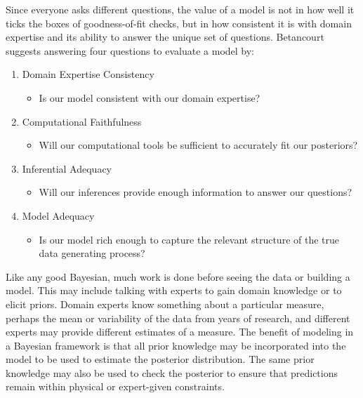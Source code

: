 \documentclass[11pt, oneside, openany]{scrbook}
\providecommand{\tightlist}{%
  \setlength{\itemsep}{0pt}\setlength{\parskip}{0pt}}
\begin{document}
Since everyone asks different questions, the value of a model is not in how well it ticks the boxes of goodness-of-fit checks, but in how consistent it is with domain expertise and its ability to answer the unique set of questions. Betancourt suggests answering four questions to evaluate a model by:

\begin{enumerate}
\def\labelenumi{\arabic{enumi}.}
\tightlist
\item
  Domain Expertise Consistency

  \begin{itemize}
  \tightlist
  \item
    Is our model consistent with our domain expertise?
  \end{itemize}
\item
  Computational Faithfulness

  \begin{itemize}
  \tightlist
  \item
    Will our computational tools be sufficient to accurately fit our posteriors?
  \end{itemize}
\item
  Inferential Adequacy

  \begin{itemize}
  \tightlist
  \item
    Will our inferences provide enough information to answer our questions?
  \end{itemize}
\item
  Model Adequacy

  \begin{itemize}
  \tightlist
  \item
    Is our model rich enough to capture the relevant structure of the true data generating process?
  \end{itemize}
\end{enumerate}

Like any good Bayesian, much work is done before seeing the data or building a model. This may include talking with experts to gain domain knowledge or to elicit priors. Domain experts know something about a particular measure, perhaps the mean or variability of the data from years of research, and different experts may provide different estimates of a measure. The benefit of modeling in a Bayesian framework is that all prior knowledge may be incorporated into the model to be used to estimate the posterior distribution. The same prior knowledge may also be used to check the posterior to ensure that predictions remain within physical or expert-given constraints.
\end{document}
